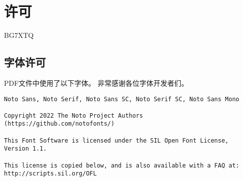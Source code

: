 \chapter*{许可}

\noindent {} BG7XTQ

\section*{字体许可}

\noindent PDF文件中使用了以下字体。
非常感谢各位字体开发者们。

\begin{verbatim}
Noto Sans, Noto Serif, Noto Sans SC, Noto Serif SC, Noto Sans Mono

Copyright 2022 The Noto Project Authors (https://github.com/notofonts/)

This Font Software is licensed under the SIL Open Font License,
Version 1.1.

This license is copied below, and is also available with a FAQ at:
http://scripts.sil.org/OFL

\end{verbatim}
